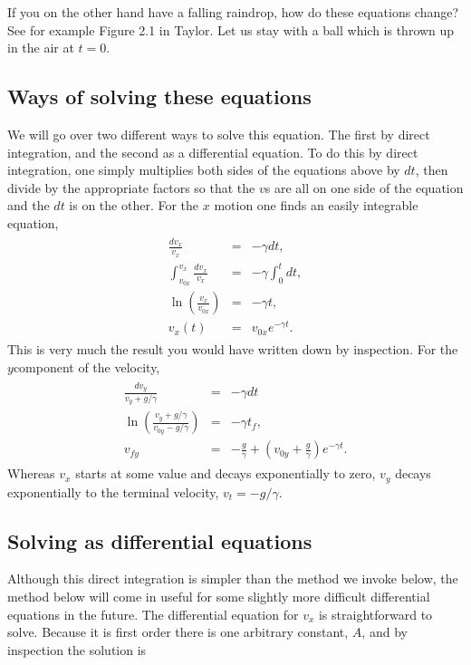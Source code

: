 \documentclass[letterpaper,10pt,english]{sphinxmanual}
\begin{document}
If you on the other hand have a falling raindrop, how do these equations change? See for example Figure 2.1 in Taylor.
Let us stay with a ball which is thrown up in the air at \(t=0\).


\subsection{Ways of solving these equations}
\label{\detokenize{chapter3:ways-of-solving-these-equations}}
We will go over two different ways to solve this equation. The first
by direct integration, and the second as a differential equation. To
do this by direct integration, one simply multiplies both sides of the
equations above by \(dt\), then divide by the appropriate factors so
that the \(v\)s are all on one side of the equation and the \(dt\) is on
the other. For the \(x\) motion one finds an easily integrable equation,
\begin{equation*}
\begin{split}
\begin{eqnarray}
\frac{dv_x}{v_x}&=&-\gamma dt,\\
\nonumber
\int_{v_{0x}}^{v_{x}}\frac{dv_x}{v_x}&=&-\gamma\int_0^{t}dt,\\
\nonumber
\ln\left(\frac{v_{x}}{v_{0x}}\right)&=&-\gamma t,\\
\nonumber
v_{x}(t)&=&v_{0x}e^{-\gamma t}.
\end{eqnarray}
\end{split}
\end{equation*}
This is very much the result you would have written down
by inspection. For the \(y\)\sphinxhyphen{}component of the velocity,
\begin{equation*}
\begin{split}
\begin{eqnarray}
\frac{dv_y}{v_y+g/\gamma}&=&-\gamma dt\\
\nonumber
\ln\left(\frac{v_{y}+g/\gamma}{v_{0y}-g/\gamma}\right)&=&-\gamma t_f,\\
\nonumber
v_{fy}&=&-\frac{g}{\gamma}+\left(v_{0y}+\frac{g}{\gamma}\right)e^{-\gamma t}.
\end{eqnarray}
\end{split}
\end{equation*}
Whereas \(v_x\) starts at some value and decays
exponentially to zero, \(v_y\) decays exponentially to the terminal
velocity, \(v_t=-g/\gamma\).


\subsection{Solving as differential equations}
\label{\detokenize{chapter3:solving-as-differential-equations}}
Although this direct integration is simpler than the method we invoke
below, the method below will come in useful for some slightly more
difficult differential equations in the future. The differential
equation for \(v_x\) is straight\sphinxhyphen{}forward to solve. Because it is first
order there is one arbitrary constant, \(A\), and by inspection the
solution is
\end{document}
